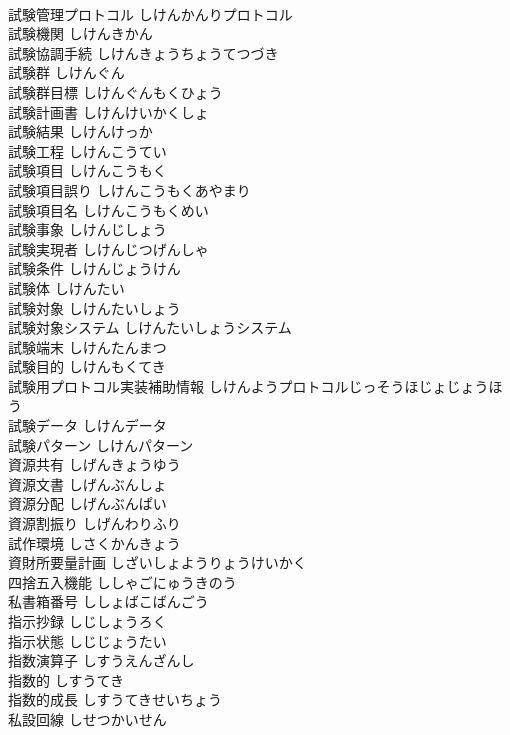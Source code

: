 \documentclass[8pt]{extreport}
\begin{document}
\begin{CJK}{UTF8}{min}
\\	試験管理プロトコル	しけんかんりプロトコル	
\\	試験機関	しけんきかん	
\\	試験協調手続	しけんきょうちょうてつづき	
\\	試験群	しけんぐん	
\\	試験群目標	しけんぐんもくひょう	
\\	試験計画書	しけんけいかくしょ	
\\	試験結果	しけんけっか	
\\	試験工程	しけんこうてい	
\\	試験項目	しけんこうもく	
\\	試験項目誤り	しけんこうもくあやまり	
\\	試験項目名	しけんこうもくめい	
\\	試験事象	しけんじしょう	
\\	試験実現者	しけんじつげんしゃ	
\\	試験条件	しけんじょうけん	
\\	試験体	しけんたい	
\\	試験対象	しけんたいしょう	
\\	試験対象システム	しけんたいしょうシステム	
\\	試験端末	しけんたんまつ	
\\	試験目的	しけんもくてき	
\\	試験用プロトコル実装補助情報	しけんようプロトコルじっそうほじょじょうほう	
\\	試験データ	しけんデータ	
\\	試験パターン	しけんパターン	
\\	資源共有	しげんきょうゆう	
\\	資源文書	しげんぶんしょ	
\\	資源分配	しげんぶんぱい	
\\	資源割振り	しげんわりふり	
\\	試作環境	しさくかんきょう	
\\	資財所要量計画	しざいしょようりょうけいかく	
\\	四捨五入機能	ししゃごにゅうきのう	
\\	私書箱番号	ししょばこばんごう	
\\	指示抄録	しじしょうろく	
\\	指示状態	しじじょうたい	
\\	指数演算子	しすうえんざんし	
\\	指数的	しすうてき	
\\	指数的成長	しすうてきせいちょう	
\\	私設回線	しせつかいせん	

\end{CJK}
\end{document}
